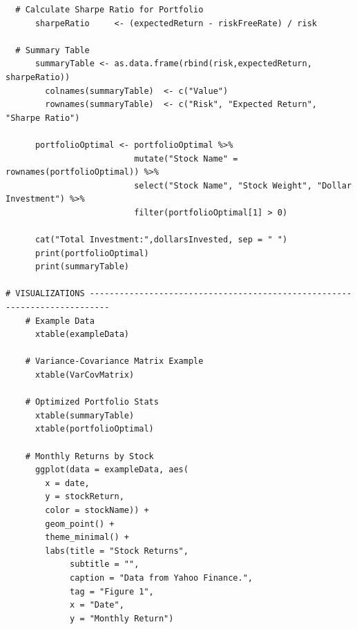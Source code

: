 \documentclass[12pt,english]{article}
\begin{document}
\begin{lstlisting}
  # Calculate Sharpe Ratio for Portfolio
      sharpeRatio     <- (expectedReturn - riskFreeRate) / risk 
      
  # Summary Table
      summaryTable <- as.data.frame(rbind(risk,expectedReturn, sharpeRatio))
        colnames(summaryTable)  <- c("Value")
        rownames(summaryTable)  <- c("Risk", "Expected Return", "Sharpe Ratio")
        
      portfolioOptimal <- portfolioOptimal %>% 
                          mutate("Stock Name" = rownames(portfolioOptimal)) %>%
                          select("Stock Name", "Stock Weight", "Dollar Investment") %>%
                          filter(portfolioOptimal[1] > 0)
        
      cat("Total Investment:",dollarsInvested, sep = " ")
      print(portfolioOptimal)
      print(summaryTable)
      
# VISUALIZATIONS --------------------------------------------------------------------------
    # Example Data
      xtable(exampleData)
      
    # Variance-Covariance Matrix Example
      xtable(VarCovMatrix)
      
    # Optimized Portfolio Stats
      xtable(summaryTable)
      xtable(portfolioOptimal)
    
    # Monthly Returns by Stock  
      ggplot(data = exampleData, aes(
        x = date, 
        y = stockReturn,
        color = stockName)) +
        geom_point() +
        theme_minimal() +
        labs(title = "Stock Returns",
             subtitle = "",
             caption = "Data from Yahoo Finance.",
             tag = "Figure 1",
             x = "Date",
             y = "Monthly Return")

        \end{lstlisting}
    
\end{document}
